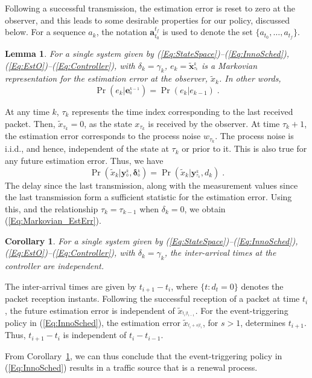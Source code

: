 \documentclass[journal]{IEEEtran}
\newcommand{\vect}[1]{\bm{#1}} \newcommand{\D}{\displaystyle}
\newtheorem{corollary}[theorem]{Corollary}
\newtheorem{lemma}[theorem]{Lemma}
\begin{document}
Following a successful transmission, the estimation error is reset to zero at the observer, and this leads to some desirable properties for our policy, discussed below. For a sequence $a_k$, the notation $\vect{a}_{t_0}^{t_f}$ is used to denote the set $\{a_{t_0},\dots,a_{t_f}\}$.
\begin{lemma} \label{Lemma:Markovian_EstErr}
For a single system given by (\ref{Eq:StateSpace})--(\ref{Eq:InnoSched}), (\ref{Eq:EstO})--(\ref{Eq:Controller}), with $\delta_k = \gamma_k$, $e_k = \vect{\tilde{x}}_{^{\tau_k}}^{_{k}}$ is a Markovian representation for the estimation error at the observer, $\tilde{x}_k$. In other words,
\begin{equation} \label{Eq:Markovian_EstErr}
\Pr(e_k|\vect{e}_{^{0}}^{_{k-1}}) = \Pr(e_k|e_{k-1}) \; .
\end{equation}
\end{lemma}
\begin{IEEEproof}
At any time $k$, $\tau_k$ represents the time index corresponding to the last received packet. Then, $\tilde{x}_{\tau_k} = 0$, as the state $x_{\tau_k}$ is received by the observer. At time $\tau_k+1$, the estimation error corresponds to the process noise $w_{\tau_k}$. The process noise is i.i.d., and hence, independent of the state at $\tau_k$ or prior to it. This is also true for any future estimation error. Thus, we have
\begin{equation*}
\Pr(\tilde{x}_{k}|\vect{y}_{^{0}}^{_{k}},\vect{\delta}_{^{0}}^{_{k}}) = \Pr(\tilde{x}_{k}|\vect{y}_{^{\tau_k}}^{_{k}},d_k) \; .
\end{equation*}
The delay since the last transmission, along with the measurement values since the last transmission form a sufficient statistic for the estimation error. Using this, and the relationship $\tau_k = \tau_{k-1}$ when $\delta_k = 0$, we obtain (\ref{Eq:Markovian_EstErr}).
\end{IEEEproof}

\begin{corollary} \label{Corollary:ETrenewal}
For a single system given by (\ref{Eq:StateSpace})--(\ref{Eq:InnoSched}), (\ref{Eq:EstO})--(\ref{Eq:Controller}), with $\delta_k = \gamma_k$, the inter-arrival times at the controller are independent.
\end{corollary}
\begin{IEEEproof}
The inter-arrival times are given by $t_{i+1} - t_i$, where $\{t: d_{t}=0\}$ denotes the packet reception instants. Following the successful reception of a packet at time $t_i$, the future estimation error is independent of $\tilde{x}_{^{t_{i}|t_{i-1}}}$. For the event-triggering policy in (\ref{Eq:InnoSched}), the estimation error $\tilde{x}_{^{t_{i}+s|t_{i}}}$, for $s>1$, determines $t_{i+1}$. Thus, $t_{i+1} - t_i$ is independent of $t_i - t_{i-1}$.
\end{IEEEproof}
From Corollary~\ref{Corollary:ETrenewal}, we can thus conclude that the event-triggering policy in (\ref{Eq:InnoSched}) results in a traffic source that is a renewal process.
\end{document}
